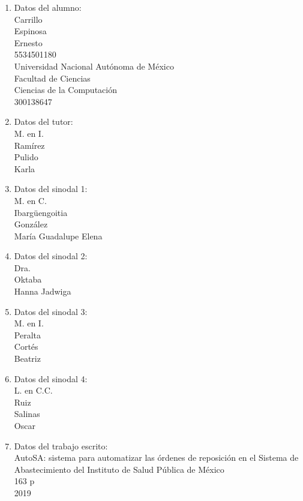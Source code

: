 \thispagestyle{empty}
\begin{singlespace}
\begin{enumerate}
	\item Datos del alumno:\\
	Carrillo\\
	Espinosa\\
	Ernesto\\
	5534501180\\
	Universidad Nacional Autónoma de México\\
	Facultad de Ciencias\\
	Ciencias de la Computación\\
	300138647
	\item Datos del tutor:\\
	M. en I.\\
	Ramírez\\
	Pulido\\
	Karla
	\item Datos del sinodal 1:\\
	M. en C.\\
	Ibargüengoitia\\
	González\\
	María Guadalupe Elena
	\item Datos del sinodal 2:\\
	Dra.\\
	Oktaba\\
	Hanna Jadwiga
	\item Datos del sinodal 3:\\
	M. en I.\\
	Peralta\\
	Cortés\\
	Beatriz
	\item Datos del sinodal 4:\\
	L. en C.C.\\
	Ruiz\\
	Salinas\\
	Oscar
	\item Datos del trabajo escrito:\\
	AutoSA: sistema para automatizar las órdenes de reposición en el Sistema de Abastecimiento del Instituto de Salud Pública de México\\
	163 p\\
	2019
	\thispagestyle{empty}
\end{enumerate}
\end{singlespace}